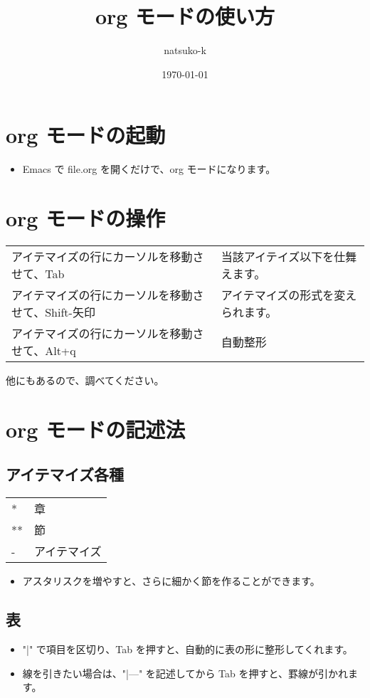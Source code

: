 \documentclass[11pt,a4paper,xdvipdfmx]{article}
\author{natsuko-k}
\date{\today}
\title{org モードの使い方}
\begin{document}
\maketitle


\section{org モードの起動}
\label{sec-1}
\begin{itemize}
\item Emacs で file.org を開くだけで、org モードになります。
\end{itemize}
\section{org モードの操作}
\label{sec-2}
\begin{center}
\begin{tabular}{ll}
アイテマイズの行にカーソルを移動させて、Tab & 当該アイテイズ以下を仕舞えます。\\
アイテマイズの行にカーソルを移動させて、Shift-矢印 & アイテマイズの形式を変えられます。\\
アイテマイズの行にカーソルを移動させて、Alt+q & 自動整形\\
\end{tabular}
\end{center}

他にもあるので、調べてください。

\section{org モードの記述法}
\label{sec-3}
\subsection{アイテマイズ各種}
\label{sec-3-1}
\begin{center}
\begin{tabular}{ll}
* & 章\\
** & 節\\
- & アイテマイズ\\
\end{tabular}
\end{center}
\begin{itemize}
\item アスタリスクを増やすと、さらに細かく節を作ることができます。
\end{itemize}

\subsection{表}
\label{sec-3-2}
\begin{itemize}
\item "|" で項目を区切り、Tab を押すと、自動的に表の形に整形してくれます。

\item 線を引きたい場合は、"|---" を記述してから Tab を押すと、罫線が引かれます。
\end{itemize}
\end{document}
